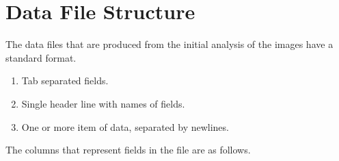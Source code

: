 
\section{Data File Structure}
\label{app:data_file_structure}

The data files that are produced from the initial analysis of the images have a
standard format.

\begin{enumerate}
	\item Tab separated fields.
	\item Single header line with names of fields.
	\item One or more item of data, separated by newlines.
\end{enumerate}

The columns that represent fields in the file are as follows.

